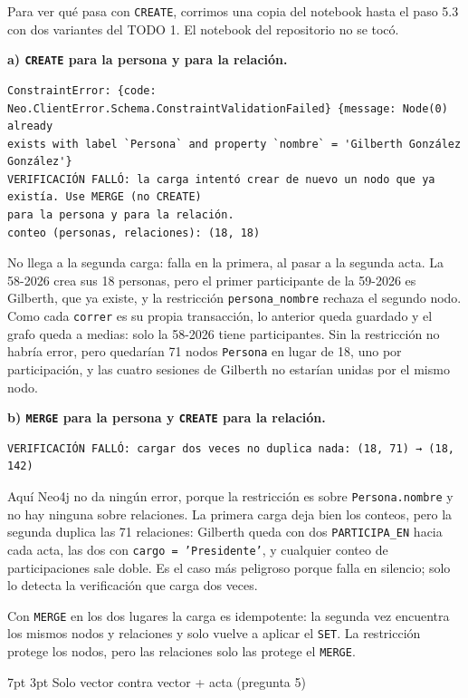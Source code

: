 \documentclass[10pt,letterpaper]{article}
\makeatletter
\renewcommand\section{\@startsection{section}{1}{\z@}%
  {7pt \@plus 2pt \@minus 1pt}{3pt}%
  {\normalfont\normalsize\bfseries\color{acc}}}
\makeatother
\begin{document}
Para ver qué pasa con \texttt{CREATE}, corrimos una copia del notebook hasta el paso 5.3 con dos
variantes del TODO 1. El notebook del repositorio no se tocó.

\textbf{a) \texttt{CREATE} para la persona y para la relación.}
\begin{Verbatim}
ConstraintError: {code: Neo.ClientError.Schema.ConstraintValidationFailed} {message: Node(0) already
exists with label `Persona` and property `nombre` = 'Gilberth González González'}
VERIFICACIÓN FALLÓ: la carga intentó crear de nuevo un nodo que ya existía. Use MERGE (no CREATE)
para la persona y para la relación.
conteo (personas, relaciones): (18, 18)
\end{Verbatim}
No llega a la segunda carga: falla en la primera, al pasar a la segunda acta. La 58-2026 crea sus 18
personas, pero el primer participante de la 59-2026 es Gilberth, que ya existe, y la restricción
\texttt{persona\_nombre} rechaza el segundo nodo. Como cada \texttt{correr} es su propia transacción, lo
anterior queda guardado y el grafo queda a medias: solo la 58-2026 tiene participantes. Sin la
restricción no habría error, pero quedarían 71 nodos \texttt{Persona} en lugar de 18, uno por
participación, y las cuatro sesiones de Gilberth no estarían unidas por el mismo nodo.

\textbf{b) \texttt{MERGE} para la persona y \texttt{CREATE} para la relación.}
\begin{Verbatim}
VERIFICACIÓN FALLÓ: cargar dos veces no duplica nada: (18, 71) → (18, 142)
\end{Verbatim}
Aquí Neo4j no da ningún error, porque la restricción es sobre \texttt{Persona.nombre} y no hay ninguna
sobre relaciones. La primera carga deja bien los conteos, pero la segunda duplica las 71 relaciones:
Gilberth queda con dos \texttt{PARTICIPA\_EN} hacia cada acta, las dos con \texttt{cargo = 'Presidente'},
y cualquier conteo de participaciones sale doble. Es el caso más peligroso porque falla en silencio; solo
lo detecta la verificación que carga dos veces.

Con \texttt{MERGE} en los dos lugares la carga es idempotente: la segunda vez encuentra los mismos nodos
y relaciones y solo vuelve a aplicar el \texttt{SET}. La restricción protege los nodos, pero las
relaciones solo las protege el \texttt{MERGE}.

\section{Solo vector contra vector + acta (pregunta 5)}
\end{document}
